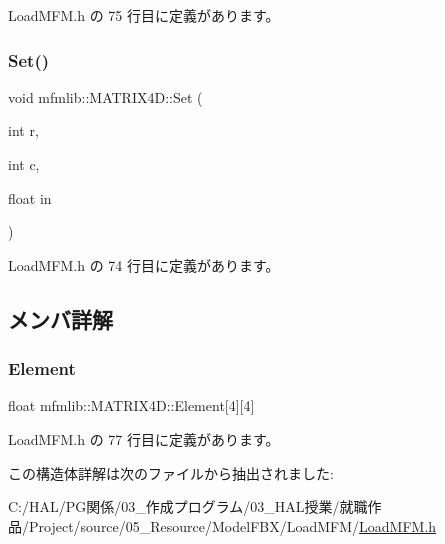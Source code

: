  Load\+M\+F\+M.\+h の 75 行目に定義があります。

\mbox{\label{structmfmlib_1_1_m_a_t_r_i_x4_d_a9401e25debd929fe663fd36c8fbdba1e}} 
\subsubsection{\texorpdfstring{Set()}{Set()}}
{\footnotesize\ttfamily void mfmlib\+::\+M\+A\+T\+R\+I\+X4\+D\+::\+Set (\begin{DoxyParamCaption}\item[{int}]{r,  }\item[{int}]{c,  }\item[{float}]{in }\end{DoxyParamCaption})\hspace{0.3cm}{\ttfamily [inline]}}



 Load\+M\+F\+M.\+h の 74 行目に定義があります。



\subsection{メンバ詳解}
\mbox{\label{structmfmlib_1_1_m_a_t_r_i_x4_d_a2db454ab2b2a50783ca0c712b2f47d76}} 
\subsubsection{\texorpdfstring{Element}{Element}}
{\footnotesize\ttfamily float mfmlib\+::\+M\+A\+T\+R\+I\+X4\+D\+::\+Element\mbox{[}4\mbox{]}\mbox{[}4\mbox{]}\hspace{0.3cm}{\ttfamily [private]}}



 Load\+M\+F\+M.\+h の 77 行目に定義があります。



この構造体詳解は次のファイルから抽出されました\+:\begin{DoxyCompactItemize}
\item 
C\+:/\+H\+A\+L/\+P\+G関係/03\+\_\+作成プログラム/03\+\_\+\+H\+A\+L授業/就職作品/\+Project/source/05\+\_\+\+Resource/\+Model\+F\+B\+X/\+Load\+M\+F\+M/\mbox{\hyperlink{_load_m_f_m_8h}{Load\+M\+F\+M.\+h}}\end{DoxyCompactItemize}
